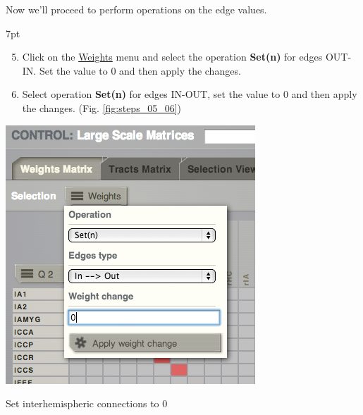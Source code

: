 \documentclass{tufte-handout}
\newenvironment{formal}{%
  \def\FrameCommand{%
    \hspace{1pt}%
    {\color{DarkBlue}\vrule width 2pt}%
    {\color{formalshade}\vrule width 4pt}%
    \colorbox{formalshade}%
  }%
  \MakeFramed{\advance\hsize-\width\FrameRestore}%
  \noindent\hspace{-4.55pt}%
  \begin{adjustwidth}{}{7pt}%
  \vspace{2pt}\vspace{2pt}%
}
{%
  \vspace{2pt}\end{adjustwidth}\endMakeFramed%
}
\begin{document}
\noindent Now we'll proceed to perform operations on the edge values. 

\begin{formal}
  \begin{enumerate}[resume]
  \setcounter{enumi}{4}
  \item Click on the \underline{Weights}  menu and select the operation \textbf{Set(n)} for edges OUT-IN. Set the value to 0 and then apply the changes. 
  \item Select operation \textbf{Set(n)} for edges IN-OUT, set the value to 0 and then apply the changes. (Fig. \ref{fig:steps_05_06})
  \end{enumerate}
\end{formal}

\begin{marginfigure}
  \includegraphics[width=\linewidth]{Handout_UI_ModellingStructuralLesions_EdgeOperations}%
  \caption{Set interhemispheric connections to 0}%
  \label{fig:steps_05_06}%
\end{marginfigure}
\end{document}
